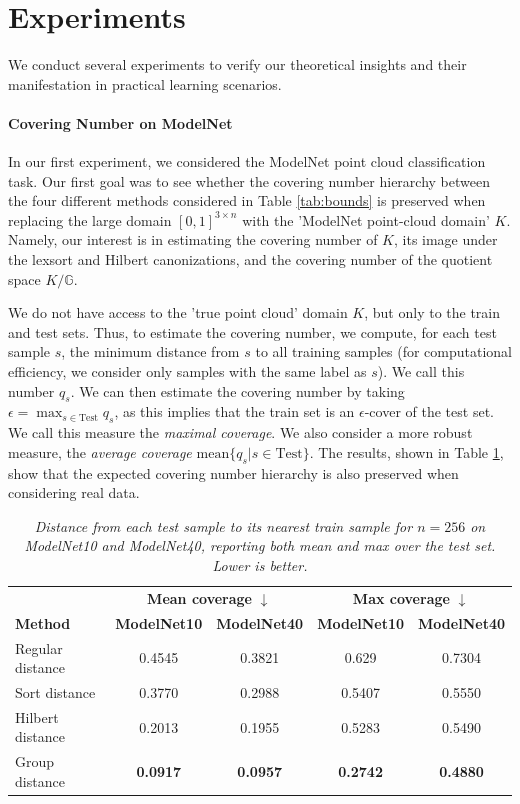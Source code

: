 \documentclass{article}
\theoremstyle{definition}
\theoremstyle{plain}
\newcommand{\G}{\mathbb{G}}
\begin{document}
\section{Experiments}
We conduct several experiments to verify our theoretical insights and their manifestation in practical learning scenarios. 

\paragraph{Covering Number on ModelNet} In our first experiment, we considered the ModelNet \cite{wu20153d} point cloud classification task. Our first goal was to see whether the covering number hierarchy between the four different methods considered in Table \ref{tab:bounds} is preserved when replacing the large domain $[0,1]^{3\times n}$ with the 'ModelNet point-cloud domain' $K$. Namely, our interest is in estimating the covering number of $K $, its image under the lexsort and Hilbert canonizations, and the covering number of the quotient space $K/\G $.    

We do not have access to the 'true point cloud' domain $K$, but only to the train and test sets. Thus, to estimate the covering number, we compute, for each test sample $s$, the minimum distance from $s$ to all training samples (for computational efficiency, we consider only samples with the same label as $s$). We call this number $q_s$. We can then estimate the covering number by taking $\epsilon=\max_{s\in \mathrm{Test}} q_s $, as this implies that the train set is an $\epsilon$-cover of the test set. We call this measure the \emph{maximal coverage}. We also consider a more robust measure, the \emph{average coverage} $\mathrm{mean} \{ q_s| s\in \mathrm{Test} \} $. The results, shown in Table \ref{tab:distances_both}, show that the expected covering number hierarchy is also preserved when considering real data. 

\begin{table}[h]
\centering
\caption{\it Distance from each test sample to its nearest train sample for $n=256$ on ModelNet10 and ModelNet40, reporting both mean and max over the test set. Lower is better.}
\label{tab:distances_both}
\begin{tabular}{lcccc}
\toprule
 & \multicolumn{2}{c}{\textbf{Mean coverage} $\downarrow$} 
 & \multicolumn{2}{c}{\textbf{Max coverage} $\downarrow$} \\
\textbf{Method} 
& \textbf{ModelNet10} 
& \textbf{ModelNet40} 
& \textbf{ModelNet10} 
& \textbf{ModelNet40} \\
\midrule
Regular distance & 0.4545 & 0.3821 & 0.629  & 0.7304 \\
Sort distance    & 0.3770 & 0.2988 & 0.5407 & 0.5550 \\
Hilbert distance & 0.2013 & 0.1955 & 0.5283 & 0.5490 \\
Group distance   & \textbf{0.0917} & \textbf{0.0957} & \textbf{0.2742} & \textbf{0.4880} \\
\bottomrule
\end{tabular}
\end{table}
\end{document}
